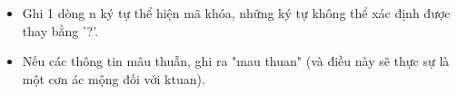 \begin{itemize}
	\item Ghi 1 dòng n ký tự thể hiện mã khóa, những ký tự không thể xác định được thay bằng '?'.
	\item Nếu các thông tin mâu thuẫn, ghi ra "mau thuan" (và điều này sẽ thực sự là một cơn ác mộng đối với ktuan).
\end{itemize}